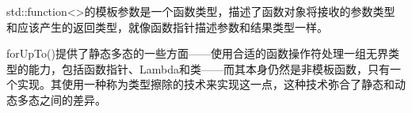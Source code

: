 std::function<>的模板参数是一个函数类型，描述了函数对象将接收的参数类型和应该产生的返回类型，就像函数指针描述参数和结果类型一样。

forUpTo()提供了静态多态的一些方面——使用合适的函数操作符处理一组无界类型的能力，包括函数指针、Lambda和类——而其本身仍然是非模板函数，只有一个实现。其使用一种称为类型擦除的技术来实现这一点，这种技术弥合了静态和动态多态之间的差异。






























